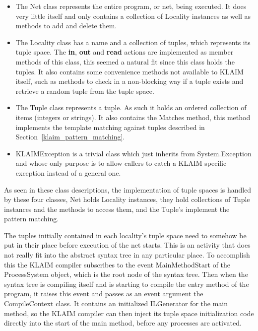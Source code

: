 	\begin{itemize}
	
	\item The \textsf{Net} class represents the entire program, or net, being 
	executed. It does very little itself and only contains a collection of 
	\textsf{Locality} instances as well as methods to add and delete them. 
	
	\item The \textsf{Locality} class has a name and a collection of tuples, 
	which 
	represents its tuple space. The \textbf{in}, \textbf{out} and \textbf{read} 
	actions are implemented as member methods of this class, this seemed a 
	natural fit since this class holds the tuples. It also contains some 
	convenience methods not available to KLAIM itself, such as methods to check 
	in a non-blocking way if a tuple exists and retrieve a random tuple from the 
	tuple space.

	\item The \textsf{Tuple} class represents a tuple. As such it holds an 
	ordered collection of items (integers or strings). It also contains the 
	\textsf{Matches} method, this method implements the template matching 
	against tuples described in Section~\ref{klaim_pattern_matching}.
	
	\item \textsf{KLAIMException} is a trivial class which just inherits from 
	\textsf{System.Exception} and whose only purpose is to allow callers to 
	catch a KLAIM specific exception instead of a general one.
	
	\end{itemize}
	
	As seen in these class descriptions, the implementation of tuple spaces is 
	handled by these four classes, \textsf{Net} holds \textsf{Locality} 
	instances, they hold collections of \textsf{Tuple} instances and the methods 
	to access them, and the \textsf{Tuple}'s implement the pattern matching.
	
	The tuples initially contained in each locality's tuple space need to 
	somehow be put in their place before execution of the net starts. This is an 
	activity that does not really fit into the abstract syntax tree in any 
	particular place. To accomplish this the KLAIM compiler subscribes to the 
	event \textsf{MainMethodStart} of the \textsf{ProcessSystem} object, which 
	is the root node of the syntax tree. Then when the syntax tree is compiling 
	itself and is starting to compile the entry method of the program, it raises 
	this event and passes as an event argument the \textsf{CompileContext} 
	class. It contains an initialized \textsf{ILGenerator} for the main method, 
	so the KLAIM compiler can then inject its tuple space initialization code 
	directly into the start of the main method, before any processes are 
	activated.
	
